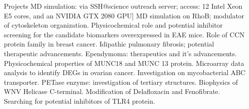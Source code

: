 
\begin{rubric}{Projects}
    \noentry{}
    \entry*[2022]
        MD simulation: via SSH@science outreach server; access: 12 Intel Xeon E5 cores, and an NVIDIA GTX 2080 GPU]
    \entry*[2022]
        MD simulation on RhoB; modulator of cytoskeleton organization.
    \entry*[2021]
        Physicochemical role and potential inhibitor screening for the candidate biomarkers overexpressed in EAE mice.
     \entry*[2021]
        Role of CCN protein family in breast cancer.
    \entry*[2021]
        Idipathic pulmonary fibrosis; potential therapeutic advancements.
    \entry*[2021]
        Ependymoma: therapeutics and it's advancements.
    \entry*[2020]
        Physicochemical properties of MUNC18 and MUNC 13 protein.
    \entry*[2020]
        Microarray data analysis to identify DEGs in ovarian cancer.
    \entry*[2019]
        Investigation on mycobacterial ABC transporter.
    \entry*[2019]
        PETase enzyme: investigation of tertiary structures.
    \entry*[2019]
        Biophysics of WNV Helicase C-terminal.
    \entry*[2018]
        Modification of Delafloxacin and Fenofibrate.
    \entry*[2017]
        Searching for potential inhibitors of TLR4 protein.
\end{rubric}
    